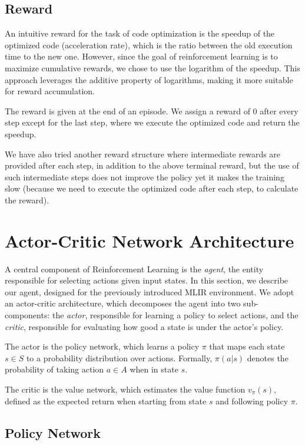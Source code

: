 \documentclass[10pt,twocolumn]{article}
\begin{document}
\subsection{Reward}
\label{sec:reward}

An intuitive reward for the task of code optimization is the speedup of the optimized code (acceleration rate), which is the ratio between the old execution time to the new one. However, since the goal of reinforcement learning is to maximize cumulative rewards, we chose to use the logarithm of the speedup. This approach leverages the additive property of logarithms, making it more suitable for reward accumulation.

The reward is given at the end of an episode. We assign a reward of 0 after every step except for the last step, where we execute the optimized code and return the speedup.

We have also tried another reward structure where intermediate rewards are provided after each step, in addition to the above terminal reward, but the use of such intermediate steps does not improve the policy yet it makes the training slow (because we need to execute the optimized code after each step, to calculate the reward).

\section{Actor-Critic Network Architecture}
\label{sec:actorcritic}

A central component of Reinforcement Learning is the \emph{agent}, the entity responsible for selecting actions given input states. In this section, we describe our agent, designed for the previously introduced MLIR environment. We adopt an actor-critic architecture, which decomposes the agent into two sub-components: the \emph{actor}, responsible for learning a policy to select actions, and the \emph{critic}, responsible for evaluating how good a state is under the actor's policy.

The actor is the policy network, which learns a policy $\pi$ that maps each state $s \in S$ to a probability distribution over actions. Formally, $\pi(a|s)$ denotes the probability of taking action $a \in A$ when in state $s$.

The critic is the value network, which estimates the value function $v_\pi(s)$, defined as the expected return when starting from state $s$ and following policy $\pi$.

\subsection{Policy Network}
\end{document}
